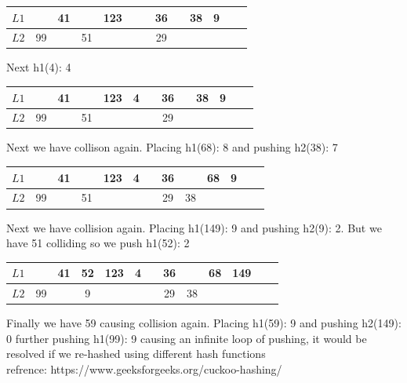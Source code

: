 \documentclass[addpoints]{exam}
\begin{document}
\begin{solution}
    \begin{center}
      \begin{tabular}{|l||*{12}{c|}}
        \hline
        $L1$  &  & 41 &  & 123 &  &  & 36 &   & 38  & 9  \\\hline
        $L2$  & 99 &  & 51 &  &  &  & 29 &   &   &   \\\hline
      \end{tabular}
    \end{center}
    Next h1(4): 4\\
    \begin{center}
      \begin{tabular}{|l||*{12}{c|}}
        \hline
        $L1$  &  & 41 &  & 123 & 4 &  & 36 &   & 38  & 9  \\\hline
        $L2$  & 99 &  & 51 &  &  &  & 29 &   &   &   \\\hline
      \end{tabular}
    \end{center}
    Next we have collison again. Placing h1(68): 8 and pushing h2(38): 7\\
     \begin{center}
      \begin{tabular}{|l||*{12}{c|}}
        \hline
        $L1$  &  & 41 &  & 123 & 4 &  & 36 &   & 68  & 9  \\\hline
        $L2$  & 99 &  & 51 &  &  &  & 29 & 38  &   &   \\\hline
      \end{tabular}
    \end{center}
    Next we have collision again. Placing h1(149): 9 and  pushing h2(9): 2. But we have 51 colliding so we push h1(52): 2\\
    \begin{center}
      \begin{tabular}{|l||*{12}{c|}}
        \hline
        $L1$  &  & 41 & 52 & 123 & 4 &  & 36 &   & 68  & 149  \\\hline
        $L2$  & 99 &  & 9 &  &  &  & 29 & 38  &   &   \\\hline
      \end{tabular}
    \end{center}
    Finally we have 59 causing collision again. Placing h1(59): 9 and pushing h2(149): 0 further pushing h1(99): 9 causing an infinite loop of pushing, it would be resolved if we re-hashed using different hash functions\\
    refrence: https://www.geeksforgeeks.org/cuckoo-hashing/
\end{solution}
\end{document}
